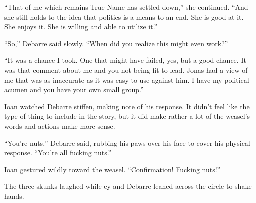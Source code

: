 ``That of me which remains True Name has settled down,'' she continued. ``And she still holds to the idea that politics is a means to an end. She is good at it. She enjoys it. She is willing and able to utilize it.''

``So,'' Debarre said slowly. ``When did you realize this might even work?''

``It was a chance I took. One that might have failed, yes, but a good chance. It was that comment about me and you not being fit to lead. Jonas had a view of me that was as inaccurate as it was easy to use against him. I have my political acumen and you have your own small group.''

Ioan watched Debarre stiffen, making note of his response. It didn't feel like the type of thing to include in the story, but it did make rather a lot of the weasel's words and actions make more sense.

``You're nuts,'' Debarre said, rubbing his paws over his face to cover his physical response. ``You're all fucking nuts.''

Ioan gestured wildly toward the weasel. ``Confirmation! Fucking nuts!''

The three skunks laughed while ey and Debarre leaned across the circle to shake hands.
